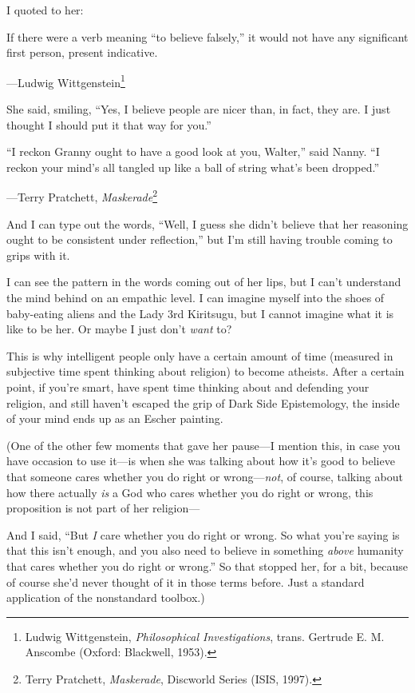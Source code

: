 {
 I quoted to her:}

{
 If there were a verb meaning ``to believe
falsely,'' it would not have any significant first
person, present indicative.}

{\raggedleft
 {}---Ludwig Wittgenstein\footnote{Ludwig Wittgenstein, \textit{Philosophical Investigations},
trans. Gertrude E. M. Anscombe (Oxford: Blackwell, 1953).}
\par}


\bigskip

{
 She said, smiling, ``Yes, I believe people are
nicer than, in fact, they are. I just thought I should put it that way
for you.''}

{
 ``I reckon Granny ought to have a good look at
you, Walter,'' said Nanny. ``I
reckon your mind's all tangled up like a ball of string
what's been dropped.''}

{\raggedleft
 {}---Terry Pratchett, \textit{Maskerade}\footnote{Terry Pratchett, \textit{Maskerade}, Discworld Series (ISIS,
1997).}
\par}


\bigskip

{
 And I can type out the words, ``Well, I guess she
didn't believe that her reasoning ought to be
consistent under reflection,'' but
I'm still having trouble coming to grips with it.}

{
 I can see the pattern in the words coming out of her lips, but I
can't understand the mind behind on an empathic level.
I can imagine myself into the shoes of baby-eating aliens and the Lady
3rd Kiritsugu, but I cannot imagine what it is like to be her. Or maybe
I just don't \textit{want} to?}

{
 This is why intelligent people only have a certain amount of time
(measured in subjective time spent thinking about religion) to become
atheists. After a certain point, if you're smart, have
spent time thinking about and defending your religion, and still
haven't escaped the grip of Dark Side Epistemology, the
inside of your mind ends up as an Escher painting.}

{
 (One of the other few moments that gave her pause---I mention
this, in case you have occasion to use it---is when she was talking
about how it's good to believe that someone cares
whether you do right or wrong---\textit{not}, of course, talking about
how there actually \textit{is} a God who cares whether you do right or
wrong, this proposition is not part of her religion---}

{
 And I said, ``But \textit{I} care whether you do
right or wrong. So what you're saying is that this
isn't enough, and you also need to believe in something
\textit{above} humanity that cares whether you do right or
wrong.'' So that stopped her, for a bit, because of
course she'd never thought of it in those terms before.
Just a standard application of the nonstandard toolbox.)}

